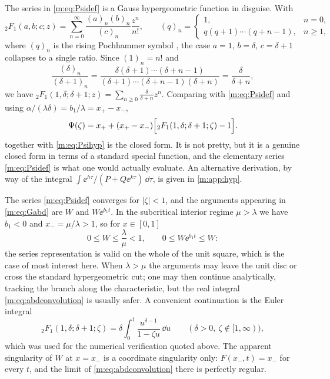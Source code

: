 The series in \cref{m:eq:Psidef} is a Gauss hypergeometric function in disguise.
With
\begin{equation}
\label{m:eq:2F1def}
{}_2F_1(a,b;c;z) = \sum_{n=0}^{\infty}\frac{(a)_n(b)_n}{(c)_n}\frac{z^n}{n!},
\qquad
(q)_n = \begin{cases}1, & n=0,\\ q(q+1)\cdots(q+n-1), & n\ge1,\end{cases}
\end{equation}
where $(q)_n$ is the rising Pochhammer symbol \cite{Olver2010}, the case $a=1$,
$b=\delta$, $c=\delta+1$ collapses to a single ratio. Since $(1)_n=n!$ and
\begin{equation}
\label{m:eq:pochcancel}
\frac{(\delta)_n}{(\delta+1)_n}
= \frac{\delta(\delta+1)\cdots(\delta+n-1)}{(\delta+1)\cdots(\delta+n-1)(\delta+n)}
= \frac{\delta}{\delta+n},
\end{equation}
we have ${}_2F_1(1,\delta;\delta+1;z) = \sum_{n\ge0}\frac{\delta}{\delta+n}z^n$.
Comparing with \cref{m:eq:Psidef} and using
$\alpha/(\lambda\delta) = b_1/\lambda = x_+-x_-$,
\begin{equation}
\label{m:eq:Psihyp}
\Psi(\zeta) = x_+ + (x_+-x_-)\Bigl[{}_2F_1(1,\delta;\delta+1;\zeta)-1\Bigr] .
\end{equation}
 together with \cref{m:eq:Psihyp} is the closed form. It is not
pretty, but it is a genuine closed form in terms of a standard special function,
and the elementary series \cref{m:eq:Psidef} is what one would actually evaluate. An
alternative derivation, by way of the integral
$\int\ee^{h\tau}/(P+Q\ee^{k\tau})\,\dd\tau$, is given in \cref{m:app:hyp}.

\begin{remark}
\label{m:rem:domain}
The series \cref{m:eq:Psidef} converges for $|\zeta|<1$, and the arguments appearing
in \cref{m:eq:Gabd} are $W$ and $W\ee^{b_1t}$. In the subcritical interior regime
$\mu>\lambda$ we have $b_1<0$ and $x_-=\mu/\lambda>1$, so for $x\in[0,1]$
\begin{equation*}
0\le W\le\frac{\lambda}{\mu}<1,
\qquad
0\le W\ee^{b_1t}\le W :
\end{equation*}
the series representation is valid on the whole of the unit square, which is the
case of most interest here. When $\lambda>\mu$ the arguments may leave the unit disc
or cross the standard hypergeometric cut; one may then continue analytically,
tracking the branch along the characteristic, but the real integral
\cref{m:eq:abdconvolution} is usually safer. A convenient continuation is the Euler
integral
\begin{equation*}
{}_2F_1(1,\delta;\delta+1;\zeta) = \delta\int_0^1\frac{u^{\delta-1}}{1-\zeta u}\,\dd u
\qquad(\delta>0,\ \zeta\notin[1,\infty)),
\end{equation*}
which was used for the numerical verification quoted above. The apparent
singularity of $W$ at $x=x_-$ is a coordinate singularity only: $F(x_-,t)=x_-$ for
every $t$, and the limit of \cref{m:eq:abdconvolution} there is perfectly regular.
\end{remark}

